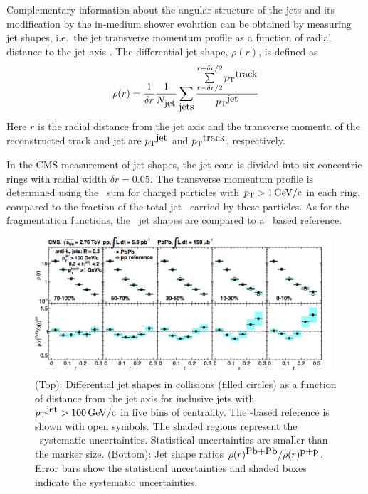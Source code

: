 Complementary information about the angular structure of the jets and its modification
by the in-medium shower evolution can be obtained by measuring jet shapes, i.e.\ the
jet transverse momentum profile as a function of radial distance to the jet axis
\cite{MehtarTani:2010ma,Idilbi:2008vm,CasalderreySolana:2011rz,CasalderreySolana:2011rq,Neufeld:2011yh,Blaizot:2012fh,Fickinger:2013xwa}.
The differential jet shape, $\rho(r)$, is defined as
\begin{equation}
\rho(r) = \frac{1}{\delta r} \frac{1}{N_{\mbox{jet}}} \sum_{\mbox{jets}}
\frac{\sum\limits_{{r - \delta r/2}}^{{r + \delta r/2}}{\mbox{$p_{\mathrm{T}}$}^{\mbox{track}}}}{\mbox{$p_{\mathrm{T}}$}^{\mbox{jet}}}
\label{eq:rho(r)}
\end{equation}
Here $r$ is the radial distance from the jet axis
and the transverse momenta of the reconstructed track and jet are
$\mbox{$p_{\mathrm{T}}$}^{\mbox{jet}}$ and $\mbox{$p_{\mathrm{T}}$}^{\mbox{track}}$, respectively.

In the CMS measurement of jet shapes, the jet cone is divided into six concentric rings
with radial width $\delta r = 0.05$. The transverse momentum profile is determined using
the \pT\ sum for charged particles with $\mbox{$p_{\mathrm{T}}$} > 1\,\mathrm{GeV/c}$ in each ring, compared to
the fraction of the total jet \pT\ carried by these particles. As for the fragmentation
functions, the \PbPb\ jet shapes are compared to a \pp\ based reference.

\begin{figure}[!ht]
\begin{center}
\includegraphics[width=0.98\textwidth]{jetfigures/JetShapes_GR.png}
\caption{\label{fig:JSRatio}
(Top): Differential jet shapes in \PbPb collisions (filled circles)
as a function of distance from the jet axis for inclusive jets with $\mbox{$p_{\mathrm{T}}$}^{\mbox{jet}} >100\,\mathrm{GeV/c}$
in five bins of centrality.  The \pp-based reference is shown with open symbols.
The shaded regions represent the \PbPb\ systematic uncertainties.
Statistical uncertainties are smaller than the marker size.
(Bottom): Jet shape ratios $\rho(r)^{\mbox{Pb+Pb}}/\rho(r)^{\mbox{p+p}}$.
Error bars show the statistical uncertainties and shaded boxes indicate the systematic uncertainties. }
\label{fig:GR:CMS_jetshapes}
\end{center}
\end{figure}

